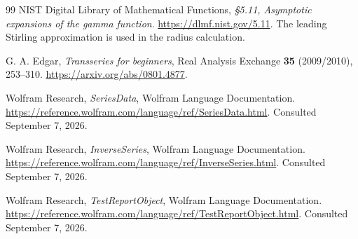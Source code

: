\documentclass[11pt,a4paper]{article}
\numberwithin{equation}{section}
\theoremstyle{definition}
\begin{document}
\begin{thebibliography}{99}
NIST Digital Library of Mathematical Functions,
\emph{\S5.11, Asymptotic expansions of the gamma function}.
\url{https://dlmf.nist.gov/5.11}.
The leading Stirling approximation is used in the radius calculation.

G. A. Edgar,
\emph{Transseries for beginners}, Real Analysis Exchange
\textbf{35} (2009/2010), 253--310.
\url{https://arxiv.org/abs/0801.4877}.

Wolfram Research,
\emph{SeriesData}, Wolfram Language Documentation.
\url{https://reference.wolfram.com/language/ref/SeriesData.html}.
Consulted September 7, 2026.

Wolfram Research,
\emph{InverseSeries}, Wolfram Language Documentation.
\url{https://reference.wolfram.com/language/ref/InverseSeries.html}.
Consulted September 7, 2026.

Wolfram Research,
\emph{TestReportObject}, Wolfram Language Documentation.
\url{https://reference.wolfram.com/language/ref/TestReportObject.html}.
Consulted September 7, 2026.

\end{thebibliography}
\end{document}
